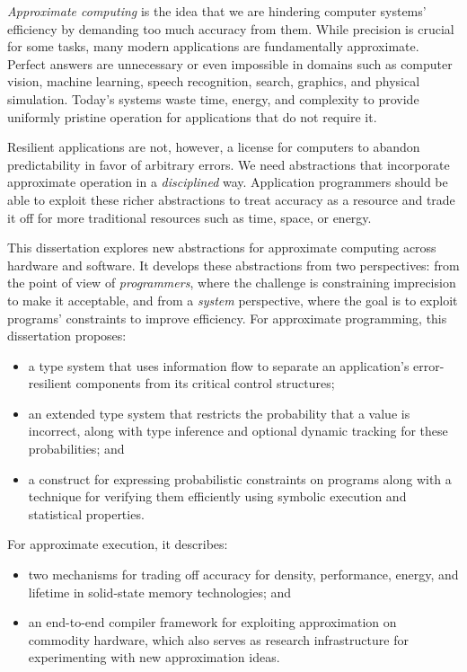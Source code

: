 \emph{Approximate computing} is the idea that we are hindering computer
systems' efficiency by demanding too much accuracy from them.
While precision is crucial for some tasks, many
modern applications are fundamentally approximate.
Perfect answers are unnecessary or even impossible in domains such as
computer vision, machine learning,
speech recognition, search, graphics, and physical simulation.
Today's systems waste time, energy, and complexity to provide uniformly
pristine operation for applications that do not require it.

Resilient applications are not, however, a license for computers to abandon
predictability in favor of arbitrary errors.
We need abstractions that incorporate approximate operation in a
\emph{disciplined} way.
Application programmers should be able to exploit these richer abstractions to
treat accuracy as a resource and trade it off for more traditional
resources such as time, space, or energy.

This dissertation explores new abstractions for approximate computing across
hardware and software.
It develops these abstractions from two perspectives:
from the point of view of \emph{programmers}, where the challenge is
constraining imprecision to make it acceptable,
and from a \emph{system} perspective, where the goal is to exploit programs'
constraints to improve efficiency.
For approximate programming, this dissertation proposes:
%
\begin{itemize}
\item
a type system that uses information flow to separate an
application's error-resilient components from its critical control structures;
\item
an extended type system that restricts the probability that a value
is incorrect, along with type inference and optional dynamic tracking for
these probabilities; and
\item
a construct for expressing probabilistic constraints on programs along with a
technique for verifying them efficiently using symbolic execution and
statistical properties.
\end{itemize}
%
For approximate execution, it describes:
%
\begin{itemize}
\item
two mechanisms for trading off accuracy for density, performance, energy, and
lifetime in solid-state memory technologies; and
\item
an end-to-end compiler framework for exploiting approximation on
commodity hardware, which also serves as research infrastructure for
experimenting with new approximation ideas.
\end{itemize}
